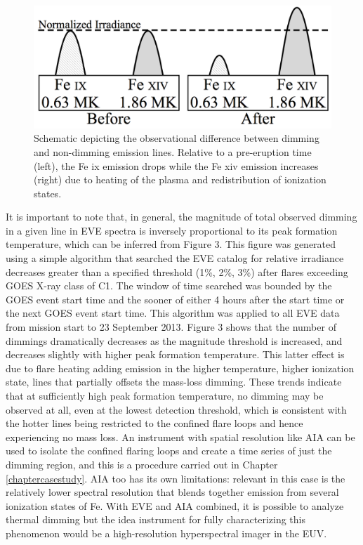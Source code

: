 \begin{figure}[!htb]
	\caption{
	    Schematic depicting the observational difference between dimming and non-dimming emission
	    lines. Relative to a pre-eruption time (left), the Fe ix emission drops while the Fe xiv
	    emission increases (right) due to heating of the plasma and redistribution of ionization
	    states.
	}
    \begin{center}
	    \includegraphics[width=150mm]{Images/ThermalDimming.png}
    \end{center}
    \label{thermalDimming}
\end{figure}

It is important to note that, in general, the magnitude of total observed dimming in a given line in EVE spectra is inversely proportional to its peak formation temperature, which can be inferred from Figure 3. This figure was generated using a simple algorithm that searched the EVE catalog for relative irradiance decreases greater than a specified threshold (1\%, 2\%, 3\%) after flares exceeding GOES X-ray class of C1. The window of time searched was bounded by the GOES event start time and the sooner of either 4 hours after the start time or the next GOES event start time. This algorithm was applied to all EVE data from mission start to 23 September 2013. Figure 3 shows that the number of dimmings dramatically decreases as the magnitude threshold is increased, and decreases slightly with higher peak formation temperature. This latter effect is due to flare heating adding emission in the higher temperature, higher ionization state, lines that partially offsets the mass-loss dimming. These trends indicate that at sufficiently high peak formation temperature, no dimming may be observed at all, even at the lowest detection threshold, which is consistent with the hotter lines being restricted to the confined flare loops and hence experiencing no mass loss. An instrument with spatial resolution like AIA can be used to isolate the confined flaring loops and create a time series of just the dimming region, and this is a procedure carried out in Chapter \ref{chaptercasestudy}. AIA too has its own limitations: relevant in this case is the relatively lower spectral resolution that blends together emission from several ionization states of Fe. With EVE and AIA combined, it is possible to analyze thermal dimming but the idea instrument for fully characterizing this phenomenon would be a high-resolution hyperspectral imager in the EUV. 

